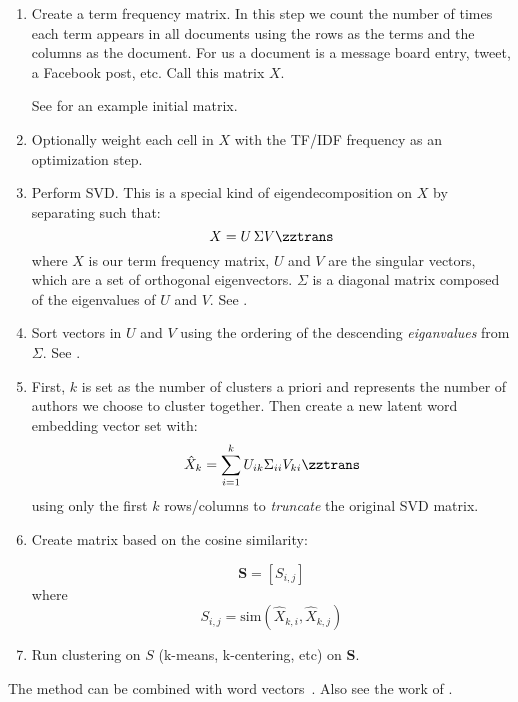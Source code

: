 \documentclass[12pt]{article}
\begin{document}
\begin{enumerate}
\item Create a term frequency matrix.  In this step we count the number of
  times each term appears in all documents using the rows as the terms and the
  columns as the document.  For us a document is a message board entry, tweet,
  a Facebook post, etc.  Call this matrix $X$.

  See  for an example initial matrix.


\item Optionally weight each cell in $X$ with the TF/IDF frequency as an
  optimization step.


\item Perform SVD.  This is a special kind of eigendecomposition on $X$ by
  separating such that:
\[X = U \, \Sigma V\zztrans\]
  where $X$ is our term frequency matrix, $U$ and $V$ are the singular vectors,
  which are a set of orthogonal eigenvectors.
  $\Sigma$ is a diagonal matrix composed of the eigenvalues of $U$ and $V$.
  See .


\item Sort vectors in $U$ and $V$ using the ordering of the descending {\it
    eiganvalues} from $\Sigma$.  See .

\item First, $k$ is set as the number of clusters a priori and represents the
  number of authors we choose to cluster together.  Then create a new latent
  word embedding vector set with:
  \[\hat{X}_k = \sum_{i=1}^{k} U_{ik} \Sigma_{ii} V_{ki}\zztrans\]
  using only the first $k$ rows/columns to {\it truncate} the original SVD
  matrix.


\item Create matrix based on the cosine similarity:

\[ \mathbf{S} = [S_{i,j}] \]
where
\[S_{i,j} = \textrm{sim}(\hat{X}_{k,i}, \hat{X}_{k,j})\]

\item Run clustering on $S$ (k-means, k-centering, etc) on $\mathbf{S}$.
\end{enumerate}

The method can be combined with word
vectors~\cite{mikolovEfficientEstimationWord2013}.  Also see the work of
\cite{biswasGraphBasedKeyword2018,charikarClusteringMinimizeSum2004}.


\medskip
\printbibliography\



\end{document}
